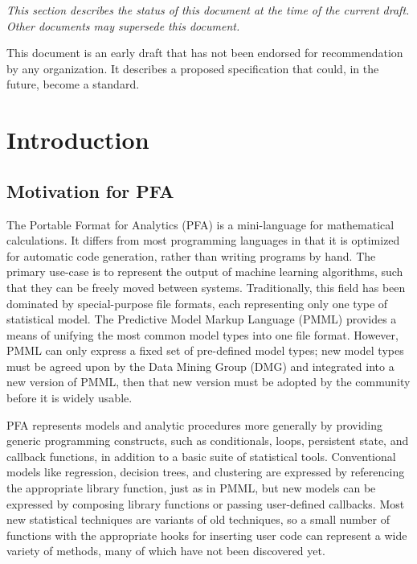 \documentclass{article}
\theoremstyle{definition}
\begin{document}
{\it This section describes the status of this document at the time of the current draft.  Other documents may supersede this document.}

This document is an early draft that has not been endorsed for recommendation by any organization.  It describes a proposed specification that could, in the future, become a standard.

\pagebreak

\tableofcontents

\pagebreak

\section{Introduction}

\subsection{Motivation for PFA}

The Portable Format for Analytics (PFA) is a mini-language for mathematical calculations.  It differs from most programming languages in that it is optimized for automatic code generation, rather than writing programs by hand.  The primary use-case is to represent the output of machine learning algorithms, such that they can be freely moved between systems.  Traditionally, this field has been dominated by special-purpose file formats, each representing only one type of statistical model.  The Predictive Model Markup Language (PMML) provides a means of unifying the most common model types into one file format.  However, PMML can only express a fixed set of pre-defined model types; new model types must be agreed upon by the Data Mining Group (DMG) and integrated into a new version of PMML, then that new version must be adopted by the community before it is widely usable.

PFA represents models and analytic procedures more generally by providing generic programming constructs, such as conditionals, loops, persistent state, and callback functions, in addition to a basic suite of statistical tools.  Conventional models like regression, decision trees, and clustering are expressed by referencing the appropriate library function, just as in PMML, but new models can be expressed by composing library functions or passing user-defined callbacks.  Most new statistical techniques are variants of old techniques, so a small number of functions with the appropriate hooks for inserting user code can represent a wide variety of methods, many of which have not been discovered yet.
\end{document}
